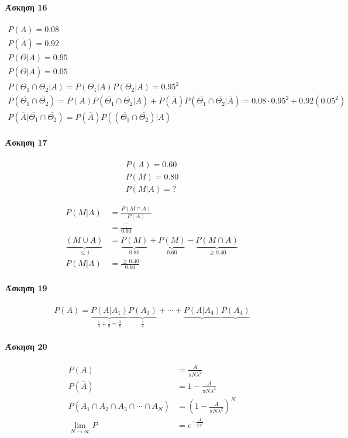 \documentclass[11pt,a4paper,titlepage,draft]{article}
\begin{document}
\paragraph{Άσκηση 16}
\begin{gather*}
P(A) = 0.08 \\
P(\overline{A}) = 0.92 \\
P(\Theta | A) = 0.95 \\
P(\Theta | \bar{A}) = 0.05 \\
P(\Theta_1 \cap \Theta_2 | A) = P(\Theta_1|A)P(\Theta_2|A) = 0.95^2 \\
P(\overline{\Theta_1} \cap \overline{\Theta_2}) = P(A)P(\overline{\Theta_1} \cap \overline{\Theta_2} | A)
+ P (\overline{A}) P (\overline{\Theta_1} \cap \overline{\Theta_2}|\overline{A})
= 0.08 \cdot 0.95^2 + 0.92 \left( 0.05^2 \right) \\
P(\overline{A}| \overline{\Theta_1} \cap \overline{\Theta_2})
= P(\overline{A})P\left((\overline{\Theta_1} \cap \overline{\Theta_2})|A\right)
\end{gather*}

\paragraph{Άσκηση 17}
\begin{gather*}
P(A) = 0.60 \\
P(M) = 0.80 \\
P(M|A) = ?
\end{gather*}

\begin{align*}
P(M|A) &= \frac{P(M \cap A)}{P(A)}
\\ &= \frac{;}{0.60}
\\
\underbrace{(M \cup A)}_{\leq 1} &=
\underbrace{P(M)}_{0.80}
+\underbrace{P(M)}_{0.60}
-\underbrace{P(M\cap A)}_{\geq 0.40}
\\ P(M|A) &= \frac{\geq 0.40}{0.60}
\end{align*}

\paragraph{Άσκηση 19}
\begin{align*}
P(A) =
\underbrace{P(A|A_1)}_{\frac{1}{4}+\frac{1}{8}=\frac{3}{8}}
\underbrace{P(A_1)}_\frac{1}{4}
+\cdots
+\underbrace{P(A|A_4)}
\underbrace{P(A_4)}
\end{align*}

\paragraph{Άσκηση 20}
\begin{align*}
P(A) &= \frac{A}{\pi N \lambda^2} \\
P(\overline{A}) &= 1 -\frac{A}{\pi N \lambda^2} \\
P(\overline{A_1}\cap\overline{A_2}\cap\overline{A_3}\cap\cdots\cap\overline{A_N}) &=
\left(
1- \frac{A}{\pi N \lambda^2}
\right)^N \\
\lim_{N\to \infty} P &= e^{-\frac{A}{\pi \lambda^2}}
\end{align*}
\end{document}
